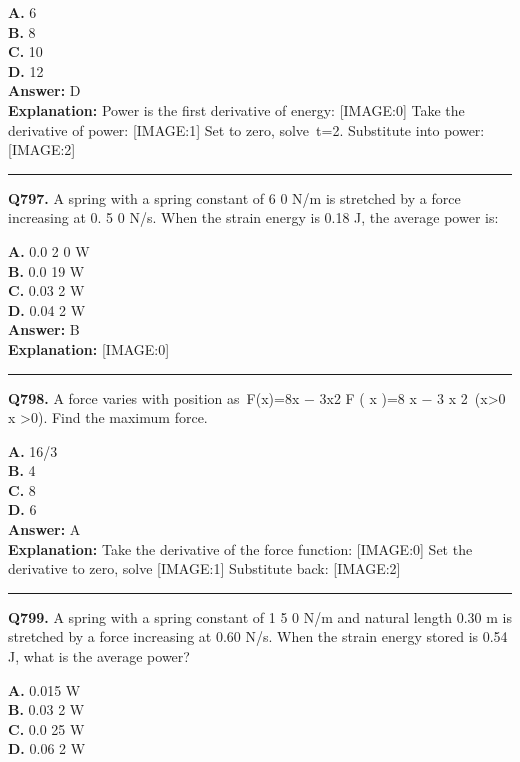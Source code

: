 \documentclass[12pt]{article}
\begin{document}
\textbf{A.} 6 \\
\textbf{B.} 8 \\
\textbf{C.} 10 \\
\textbf{D.} 12 \\

\textbf{Answer:} D \\
\textbf{Explanation:} Power is the first derivative of energy:
[IMAGE:0]
Take the derivative of power:
[IMAGE:1]
Set to zero, solve t=2. Substitute into power:
[IMAGE:2]

\hrule
\vspace{1em}


\noindent
\textbf{Q797.} A spring with a spring constant of
6
0 N/m is stretched by a force increasing at 0.
5
0 N/s. When the strain energy is 0.18 J, the average power is:



\textbf{A.} 0.0
2
0 W \\
\textbf{B.} 0.0
19
W \\
\textbf{C.} 0.03
2
W \\
\textbf{D.} 0.04
2
W \\

\textbf{Answer:} B \\
\textbf{Explanation:} [IMAGE:0]

\hrule
\vspace{1em}


\noindent
\textbf{Q798.} A force varies with position as F(x)=8x
−
3x2
F
(
x
)=8
x
−
3
x
2 (x>0
x
>0). Find the maximum force.



\textbf{A.} 16/3 \\
\textbf{B.} 4 \\
\textbf{C.} 8 \\
\textbf{D.} 6 \\

\textbf{Answer:} A \\
\textbf{Explanation:} Take the derivative of the force function:
[IMAGE:0]
Set the derivative to zero, solve
[IMAGE:1]
Substitute back:
[IMAGE:2]

\hrule
\vspace{1em}


\noindent
\textbf{Q799.} A spring with a spring constant of 1
5
0 N/m and natural length 0.30 m is stretched by a force increasing at 0.60 N/s. When the strain energy stored is 0.54 J, what is the average power?



\textbf{A.} 0.015 W \\
\textbf{B.} 0.03
2
W \\
\textbf{C.} 0.0
25
W \\
\textbf{D.} 0.06
2
W \\
\end{document}
